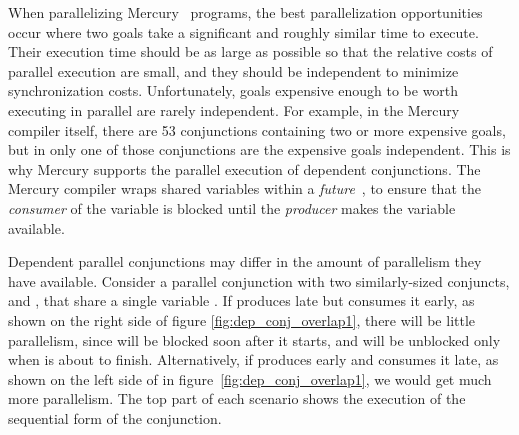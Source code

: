 % 
% 





When parallelizing Mercury~\cite{mercury_jlp} programs,
the best parallelization opportunities occur
where two goals take a significant and roughly similar time to execute.
Their execution time should be as large as possible
so that the relative costs of parallel execution are small,
and they should be independent to minimize synchronization costs.
Unfortunately, goals expensive enough to be worth executing in parallel
are rarely independent.
For example, in the Mercury compiler itself,
there are 53 conjunctions containing two or more expensive goals,
but in only one of those conjunctions are the expensive goals independent.
This is why Mercury supports the parallel execution of dependent conjunctions.
The Mercury compiler wraps shared variables within a
\emph{future}~\cite{wang_dep_par_conj}, to
ensure that the \emph{consumer} of the variable is blocked
until the \emph{producer} makes the variable available.

Dependent parallel conjunctions may differ
in the amount of parallelism they have available.
Consider a parallel conjunction with two similarly-sized conjuncts,
 and , that share a single variable .
If  produces  late but  consumes it early,
as shown on the right side of figure \ref{fig:dep_conj_overlap1},
there will be little parallelism,
since  will be blocked soon after it starts,
and will be unblocked only when  is about to finish.
Alternatively, if  produces  early
and  consumes it late,
as shown on the left side of in figure~\ref{fig:dep_conj_overlap1},
we would get much more parallelism.
The top part of each scenario
shows the execution of the sequential form of the conjunction.

